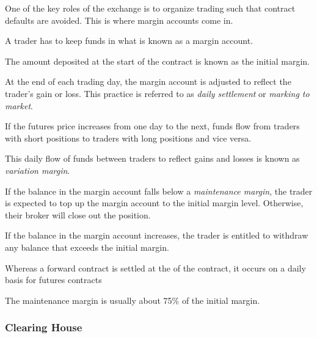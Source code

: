 \begin{definition*}
    One of the key roles of the exchange is to organize trading such that contract defaults are avoided. This is where margin accounts come in.
    \begin{definition}\label{def:margin}
        A trader has to keep funds in what is known as a margin account.
    \end{definition}
    \begin{definition}\label{def:initial}
        The amount deposited at the start of the contract is known as the initial margin.
    \end{definition}
    \begin{definition}\label{def:daily}
        At the end of each trading day, the margin account is adjusted to reflect the trader’s gain or loss. This practice is referred to as \emph{daily settlement} or \emph{marking to market}.
    \end{definition}
\end{definition*}

If the futures price increases from one day to the next, funds flow from traders with short positions to traders with long positions and vice versa.

\begin{definition}\label{def:variation}
    This daily flow of funds between traders to reflect gains and losses is known as \emph{variation margin}.
\end{definition}

If the balance in the margin account falls below a \emph{maintenance margin}, the trader is expected to top up the margin account to the initial margin level. Otherwise, their broker will close out the position.

If the balance in the margin account increases, the trader is entitled to withdraw any balance that exceeds the initial margin.

Whereas a forward contract is settled at the of the contract, it occurs on a daily basis for futures contracts

\begin{note}
    The maintenance margin is usually about 75\% of the initial margin.
\end{note}

\subsubsection*{Clearing House}

